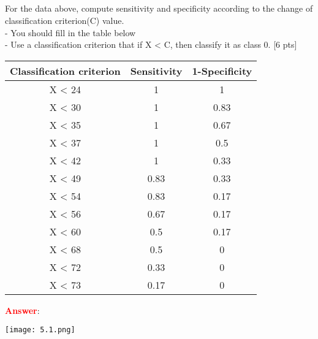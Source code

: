 \documentclass{homework}
\begin{document}
    \subsection{}
    For the data above, compute sensitivity and specificity according to the change of classification criterion(C) value.\\
    - You should fill in the table below \\
    - Use a classification criterion that if X < C, then classify it as class 0. [6 pts]

    \begin{table}[!h]
    \begin{center}
    \begin{tabular}{|c|c|c|}
    \hline
    Classification criterion & Sensitivity & 1-Specificity \\ \hline
    X < 24                     & 1           & 1           \\ \hline
    X < 30                         & 1            &  0.83     \\ \hline
    X < 35                         & 1            & 0.67              \\ \hline
    X < 37                         & 1            & 0.5              \\ \hline
    X < 42                         & 1            & 0.33              \\ \hline
    X < 49                         &  0.83           & 0.33               \\ \hline
    X < 54                         & 0.83            & 0.17               \\ \hline
    X < 56                         & 0.67            & 0.17               \\ \hline
    X < 60                         &  0.5           & 0.17              \\ \hline
    X < 68                         & 0.5            & 0              \\ \hline
    X < 72                         &  0.33           &    0           \\ \hline
    X < 73                         &  0.17           & 0               \\ \hline                         
    \end{tabular}
    \end{center}
    \end{table}
    \newpage
    \textbf{\textcolor{red}{Answer}}:
    
    \texttt{[image: 5.1.png]}
    
\end{document}
